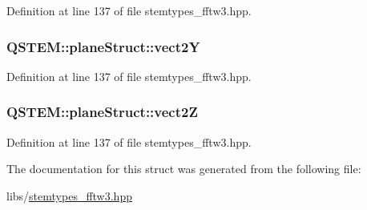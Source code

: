 Definition at line 137 of file stemtypes\-\_\-fftw3.\-hpp.

\hypertarget{struct_q_s_t_e_m_1_1plane_struct_a386edca99c095a1ae400468bf496c95e}{
\subsubsection[{vect2\-Y}]{ Q\-S\-T\-E\-M\-::plane\-Struct\-::vect2\-Y}}\label{struct_q_s_t_e_m_1_1plane_struct_a386edca99c095a1ae400468bf496c95e}


Definition at line 137 of file stemtypes\-\_\-fftw3.\-hpp.

\hypertarget{struct_q_s_t_e_m_1_1plane_struct_a971c6351788d11b711f6ccecedb201f9}{
\subsubsection[{vect2\-Z}]{ Q\-S\-T\-E\-M\-::plane\-Struct\-::vect2\-Z}}\label{struct_q_s_t_e_m_1_1plane_struct_a971c6351788d11b711f6ccecedb201f9}


Definition at line 137 of file stemtypes\-\_\-fftw3.\-hpp.



The documentation for this struct was generated from the following file\-:\begin{DoxyCompactItemize}
\item 
libs/\hyperlink{stemtypes__fftw3_8hpp}{stemtypes\-\_\-fftw3.\-hpp}\end{DoxyCompactItemize}

